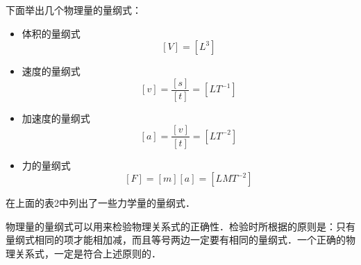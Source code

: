 下面举出几个物理量的量纲式：
\begin{itemize}
    \item 体积的量纲式
          \[[V]=\si{[L^3]}  \]
    \item 速度的量纲式
          \[[v]=\frac{[s]}{[t]}=\si{[LT^{-1}]}  \]
    \item 加速度的量纲式
          \[ [a]=\frac{[v]}{[t]}=\si{[LT^{-2}]} \]
    \item 力的量纲式
          \[ [F]=[m][a]=\si{[LMT^{-2}]} \]
\end{itemize}

在上面的表2中列出了一些力学量的量纲式．

物理量的量纲式可以用来检验物理关系式的正确性．检验时所根据的原则是：只有量纲式相同的项才能相加减，而且等号两边一定要有相同的量纲式．一个正确的物理关系式，一定是符合上述原则的．



















